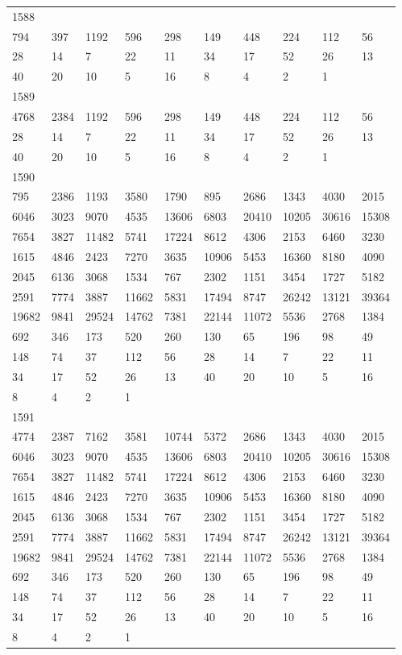 \begin{longtable}{*{10}{l}}
1588&&&&&&&&&\\
794& 397& 1192& 596& 298& 149& 448& 224& 112& 56\\
28& 14& 7& 22& 11& 34& 17& 52& 26& 13\\
40& 20& 10& 5& 16& 8& 4& 2& 1& \\

1589&&&&&&&&&\\
4768& 2384& 1192& 596& 298& 149& 448& 224& 112& 56\\
28& 14& 7& 22& 11& 34& 17& 52& 26& 13\\
40& 20& 10& 5& 16& 8& 4& 2& 1& \\

1590&&&&&&&&&\\
795& 2386& 1193& 3580& 1790& 895& 2686& 1343& 4030& 2015\\
6046& 3023& 9070& 4535& 13606& 6803& 20410& 10205& 30616& 15308\\
7654& 3827& 11482& 5741& 17224& 8612& 4306& 2153& 6460& 3230\\
1615& 4846& 2423& 7270& 3635& 10906& 5453& 16360& 8180& 4090\\
2045& 6136& 3068& 1534& 767& 2302& 1151& 3454& 1727& 5182\\
2591& 7774& 3887& 11662& 5831& 17494& 8747& 26242& 13121& 39364\\
19682& 9841& 29524& 14762& 7381& 22144& 11072& 5536& 2768& 1384\\
692& 346& 173& 520& 260& 130& 65& 196& 98& 49\\
148& 74& 37& 112& 56& 28& 14& 7& 22& 11\\
34& 17& 52& 26& 13& 40& 20& 10& 5& 16\\
8& 4& 2& 1& \\

1591&&&&&&&&&\\
4774& 2387& 7162& 3581& 10744& 5372& 2686& 1343& 4030& 2015\\
6046& 3023& 9070& 4535& 13606& 6803& 20410& 10205& 30616& 15308\\
7654& 3827& 11482& 5741& 17224& 8612& 4306& 2153& 6460& 3230\\
1615& 4846& 2423& 7270& 3635& 10906& 5453& 16360& 8180& 4090\\
2045& 6136& 3068& 1534& 767& 2302& 1151& 3454& 1727& 5182\\
2591& 7774& 3887& 11662& 5831& 17494& 8747& 26242& 13121& 39364\\
19682& 9841& 29524& 14762& 7381& 22144& 11072& 5536& 2768& 1384\\
692& 346& 173& 520& 260& 130& 65& 196& 98& 49\\
148& 74& 37& 112& 56& 28& 14& 7& 22& 11\\
34& 17& 52& 26& 13& 40& 20& 10& 5& 16\\
8& 4& 2& 1& \\


\end{longtable}
